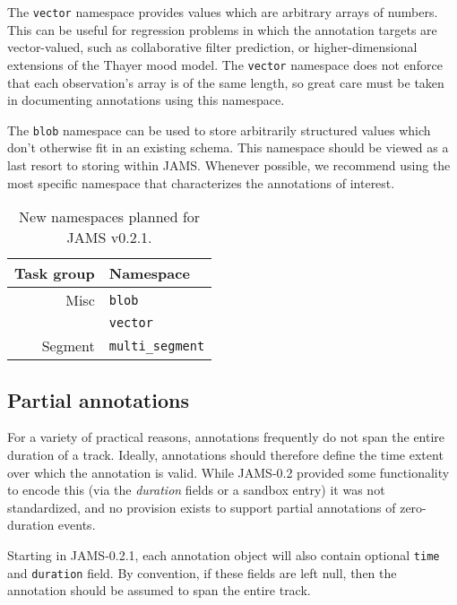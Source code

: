 \documentclass{article}
\begin{document}
The \texttt{vector} namespace provides values which are arbitrary arrays of numbers.
This can be useful for regression problems in which the annotation targets are
vector-valued, such as collaborative filter prediction, or higher-dimensional 
extensions of the Thayer mood model.  The \texttt{vector} namespace does not enforce that
each observation's array is of the same length, so great care must be taken in
documenting annotations using this namespace.

The \texttt{blob} namespace can be used to store arbitrarily structured values which
don't otherwise fit in an existing schema.  This namespace should be viewed as a last
resort to storing within JAMS.  Whenever possible, we recommend using the most specific
namespace that characterizes the annotations of interest.

\begin{table}
    \caption{New namespaces planned for JAMS v0.2.1.}\label{tab:namespaces:0.2.1}
    \centering
    \begin{tabular}{rl}
    \toprule
    Task group                  & Namespace\\
    \midrule
    Misc       & \texttt{blob}\\
                                & \texttt{vector}\\
    Segment                     & \texttt{multi\_segment}\\
    \bottomrule
    \end{tabular}
\end{table}


\subsection{Partial annotations}
For a variety of practical reasons, annotations frequently do not span the entire
duration of a track.  Ideally, annotations should therefore define the time extent over
which the annotation is valid.  While JAMS-0.2 provided some functionality to encode this
(via the \emph{duration} fields or a sandbox entry) it was not standardized, and no
provision exists to support partial annotations of zero-duration events.

Starting in JAMS-0.2.1, each annotation object will also contain optional \texttt{time} and
\texttt{duration} field.  By convention, if these fields are left null, then the
annotation should be assumed to span the entire track.





\end{document}
